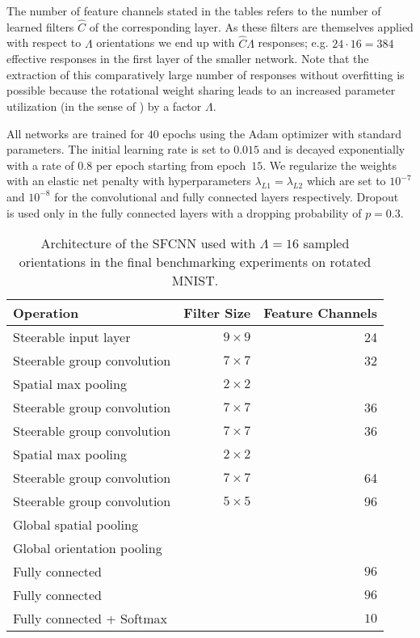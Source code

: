 \documentclass[10pt,twocolumn,letterpaper]{article}
\begin{document}
The number of feature channels stated in the tables refers to the number of learned filters $\hat{C}$ of the corresponding layer.
As these filters are themselves applied with respect to $\Lambda$ orientations we end up with $\hat{C}\Lambda$ responses; e.g. $24\cdot16=384$ effective responses in the first layer of the smaller network.
Note that the extraction of this comparatively large number of responses without overfitting is possible because the rotational weight sharing leads to an increased parameter utilization (in the sense of \citet{cohen2016steerable}) by a factor $\Lambda$.

All networks are trained for $40$ epochs using the Adam optimizer \citep{kingma2015adam} with standard parameters.
The initial learning rate is set to $0.015$ and is decayed exponentially with a rate of $0.8$ per epoch starting from epoch~$15.$
We regularize the weights with an elastic net penalty with hyperparameters $\lambda_{L1}=\lambda_{L2}$ which are set to $10^{-7}$ and $10^{-8}$ for the convolutional and fully connected layers respectively.
Dropout~\citep{srivastava2014dropout} is used only in the fully connected layers with a dropping probability of $p=0.3$.

\begin{table}[t]
	\centering
	\small
	\begin{tabular}{lrr}
		\toprule 
		Operation & Filter Size & Feature Channels \\
		\toprule 
		Steerable input layer  & $9\times 9$ &  24 \\
		Steerable group convolution  & $7\times 7$ &  32 \\
		Spatial max pooling & $2 \times 2$ & \\
		\midrule
		Steerable group convolution  & $7\times 7$ &  36 \\
		Steerable group convolution  & $7\times 7$ &  36 \\
		Spatial max pooling & $2 \times 2$ & \\
		\midrule
		Steerable group convolution  & $7\times 7$ &  64 \\
		Steerable group convolution  & $5\times 5$ &  96 \\
		Global spatial pooling \\
		Global orientation pooling \\
		\midrule
		Fully connected  & & $96$ \\
		Fully connected  & & $96$ \\
		Fully connected + Softmax  & & $10$ \\
		\bottomrule
	\end{tabular}
	\caption{Architecture of the SFCNN used with $\Lambda=16$ sampled orientations in the final benchmarking experiments on rotated MNIST.}
	\label{tab:architectureCNN2}
\end{table}
\end{document}
